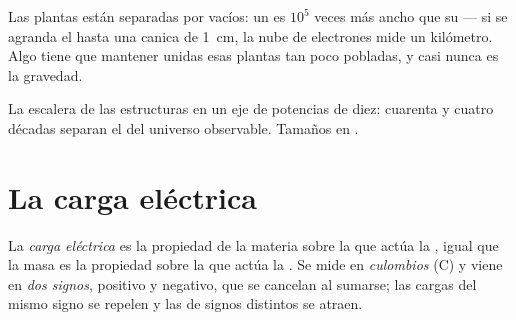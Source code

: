 \begin{remark}\label{rem:g11:fundamental-interactions:empty}
Las plantas están separadas por vacíos: un  es $10^{5}$ veces más
ancho que su  --- si se agranda el  hasta una canica de
\qty{1}{cm}, la nube de electrones mide un kilómetro. Algo tiene que
mantener unidas esas plantas tan poco pobladas, y casi nunca es la
gravedad.
\end{remark}

\begin{omfigure}

{\small La escalera de las estructuras en un eje de potencias de diez:
cuarenta y cuatro décadas separan el  del universo observable.
Tamaños en .}
\end{omfigure}

\section{La carga eléctrica}

\begin{definition}\label{def:g11:fundamental-interactions:charge}
La \emph{carga eléctrica} es la propiedad de la
materia sobre la que actúa la , igual que la
masa es la propiedad sobre la que actúa la . Se mide en
\emph{culombios} (\unit{C}) y viene en \emph{dos
signos}, positivo y negativo, que se cancelan al sumarse; las cargas del
mismo signo se repelen y las de signos distintos se atraen.
\end{definition}

